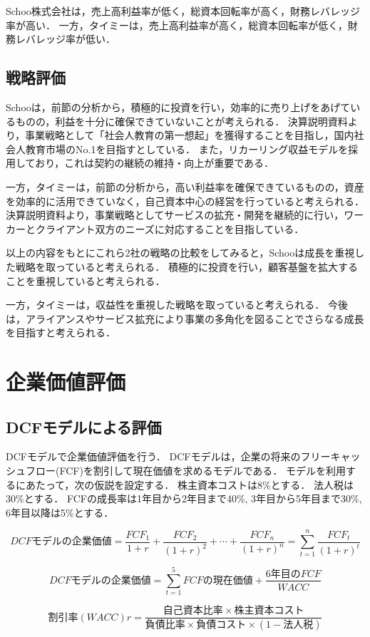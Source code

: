 \documentclass[a4paper]{ltjsarticle}
\begin{document}
Schoo株式会社は，売上高利益率が低く，総資本回転率が高く，財務レバレッジ率が高い．
一方，タイミーは，売上高利益率が高く，総資本回転率が低く，財務レバレッジ率が低い．

\subsection{戦略評価}
Schooは，前節の分析から，積極的に投資を行い，効率的に売り上げをあげているものの，利益を十分に確保できていないことが考えられる．
決算説明資料より，事業戦略として「社会人教育の第一想起」を獲得することを目指し，国内社会人教育市場のNo.1を目指すとしている．
また，リカーリング収益モデルを採用しており，これは契約の継続の維持・向上が重要である．

一方，タイミーは，前節の分析から，高い利益率を確保できているものの，資産を効率的に活用できていなく，自己資本中心の経営を行っていると考えられる．
決算説明資料より，事業戦略としてサービスの拡充・開発を継続的に行い，ワーカーとクライアント双方のニーズに対応することを目指している．

以上の内容をもとにこれら2社の戦略の比較をしてみると，Schooは成長を重視した戦略を取っていると考えられる．
積極的に投資を行い，顧客基盤を拡大することを重視していると考えられる．

一方，タイミーは，収益性を重視した戦略を取っていると考えられる．
今後は，アライアンスやサービス拡充により事業の多角化を図ることでさらなる成長を目指すと考えられる．

\section{企業価値評価}
\subsection{DCFモデルによる評価}
DCFモデルで企業価値評価を行う．
DCFモデルは，企業の将来のフリーキャッシュフロー(FCF)を割引して現在価値を求めるモデルである．
モデルを利用するにあたって，次の仮説を設定する．
株主資本コストは8\%とする．
法人税は30\%とする．
FCFの成長率は1年目から2年目まで40\%, 3年目から5年目まで30\%, 6年目以降は5\%とする．


\[
DCFモデルの企業価値 = \frac{FCF_1}{1 + r} + \frac{FCF_2}{(1 + r)^2} + \cdots + \frac{FCF_n}{(1 + r)^n}
= \sum_{t=1}^{n} \frac{FCF_t}{(1 + r)^t}
\]

\[
DCFモデルの企業価値 = \sum_{t=1}^{5} {FCFの現在価値} + \frac{6年目のFCF}{WACC}
\]

\[
割引率(WACC) r = \frac{自己資本比率 \times 株主資本コスト}{負債比率 \times 負債コスト \times (1 - 法人税)}
\]
\end{document}
